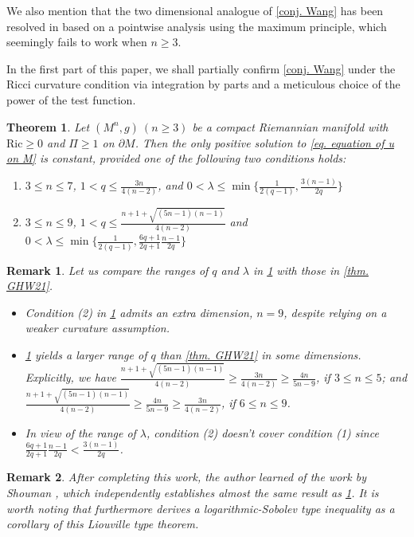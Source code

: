 \documentclass[12pt]{amsart}%
\newtheorem{theorem}{Theorem}
\newtheorem{remark}{Remark}
\numberwithin{equation}{section}
\numberwithin{lemma}{section}
\numberwithin{proposition}{section}
\numberwithin{corollary}{section}
\numberwithin{remark}{section}
\begin{document}
We also mention that the two dimensional analogue of \cref{conj. Wang} has been resolved in \cite[Theorem 2]{Wan17} based on a pointwise analysis using the maximum principle, which seemingly fails to work when $n\geq 3$.

In the first part of this paper, we shall partially confirm \cref{conj. Wang} under the Ricci curvature condition via integration by parts and a meticulous choice of the power of the test function.
\begin{theorem}\label{thm. C. Ricci}
    Let $(M^n,g)\ (n\geq 3)$ be a compact Riemannian manifold with $\mathrm{Ric}\geq 0$ and $\Pi\geq 1$ on $\partial M$. Then the only positive solution to \cref{eq. equation of u on M} is constant, provided one of the following two conditions holds:
    \begin{enumerate}
        \item $3\leq n\leq 7$, $1<q\leq \frac{3n}{4(n-2)}$, and $0<\lambda\leq \min\{\frac{1}{2(q-1)}, \frac{3(n-1)}{2q}\}$\\
        \item $3\leq n\leq 9$, $1<q\leq \frac{n+1+\sqrt{(5n-1)(n-1)}}{4(n-2)}$
        and $0<\lambda\leq \min\{\frac{1}{2(q-1)},\frac{6q+1}{2q+1}\frac{n-1}{2q}\}$
    \end{enumerate}
\end{theorem}
\begin{remark}
    Let us compare the ranges of $q$ and $\lambda$ in \cref{thm. C. Ricci} with those in \cref{thm. GHW21}.
    \begin{itemize}
    \item Condition (2) in \cref{thm. C. Ricci} admits an extra dimension, $n=9$, despite relying on a weaker curvature assumption.
        \item \cref{thm. C. Ricci} yields a larger range of $q$ than \cref{thm. GHW21} in some dimensions. Explicitly, we have   $\frac{n+1+\sqrt{(5n-1)(n-1)}}{4(n-2)}\geq \frac{3n}{4(n-2)}\geq \frac{4n}{5n-9}$, if  $3\leq n\leq 5$; and $\frac{n+1+\sqrt{(5n-1)(n-1)}}{4(n-2)}
        \geq \frac{4n}{5n-9}
        \geq \frac{3n}{4(n-2)}$, if $6\leq n\leq 9$.
        \item %
        In view of the range of $\lambda$, condition (2) doesn't cover condition (1) since $\frac{6q+1}{2q+1}\frac{n-1}{2 q}<\frac{3(n-1)}{2q}$.
    \end{itemize}
\end{remark}
\begin{remark}
    After completing this work, the author learned of the work by Shouman \cite{Sho26}, which independently establishes almost the same result as \cref{thm. C. Ricci}. It is worth noting that \cite{Sho26} furthermore derives a logarithmic-Sobolev type inequality as a corollary of this Liouville type theorem.
\end{remark}
\end{document}
